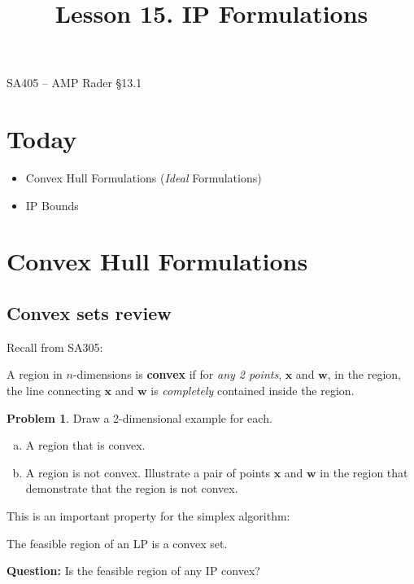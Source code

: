 \documentclass[11pt]{article}
\makeatletter
\renewcommand{\labelitemi}{$\bullet$}
\theoremstyle{definition}
\newtheorem{problem}{Problem}
\newcommand{\answerbox}[3]{%
  \fbox{%
    \begin{minipage}[#1]{#2}
      \hfill\vspace{#3}
    \end{minipage}
  }
}
\renewcommand{\maketitle}{
  \noindent SA405 -- AMP \hfill Rader \S 13.1  \\

  \begin{center}\Large{\textbf{\@title}}\end{center}
}
\makeatother
\begin{document}
  
\title{Lesson 15.  IP Formulations}

\maketitle

\section{Today}
\renewcommand\labelitemi{--}
\begin{itemize}
\item  Convex Hull Formulations (\emph{Ideal} Formulations)
\item  IP Bounds
\end{itemize}

\section{Convex Hull Formulations} 

\subsection{Convex sets review}
Recall from SA305:
\begin{tcolorbox}
A region in $n$-dimensions is \textbf{convex} if for \emph{any 2 points}, $\textbf{x}$ and $\textbf{w}$, in the region, the line connecting $\textbf{x}$ and $\textbf{w}$ is \emph{completely} contained inside the region.
\end{tcolorbox}

\begin{problem} Draw a 2-dimensional example for each.
 \begin{enumerate}[(a)]
\item A region that is convex.
\item A region is not convex.  Illustrate a pair of points $\textbf{x}$ and $\textbf{w}$ in the region that demonstrate that the region is not convex.
\end{enumerate}
\answerbox{c}{.5\textwidth}{2in} \answerbox{c}{.5\textwidth}{2in}
\end{problem}

This is an important property for the simplex algorithm:
\begin{tcolorbox}
The feasible region of an LP is a convex set. 
\end{tcolorbox}

\textbf{Question:}  Is the feasible region of any IP convex?
\end{document}
